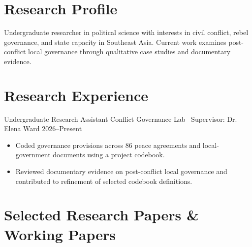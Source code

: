 \section{Research Profile}
Undergraduate researcher in political science with interests in civil conflict, rebel governance, and state capacity in Southeast Asia. Current work examines post-conflict local governance through qualitative case studies and documentary evidence.

\section{Research Experience}
\roleentry
{Undergraduate Research Assistant}
{Conflict Governance Lab \textbar\ Supervisor: Dr. Elena Ward}
{2026--Present}
\begin{itemize}
  \item Coded governance provisions across 86 peace agreements and local-government documents using a project codebook.
  \item Reviewed documentary evidence on post-conflict local governance and contributed to refinement of selected codebook definitions.
\end{itemize}

\section{Selected Research Papers \& Working Papers}
